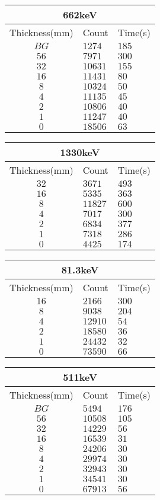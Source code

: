 \documentclass{amsart}
\begin{document}
\begin{tabular}[t]{|c|l|l|}
\hline
\multicolumn{3}{|c|}{662keV}\\
\hline
Thickness(mm) & Count & Time(s)\\
$BG$ & $1274$ & $185$ \\
$56$ & $7971$ & $300$ \\
$32$ & $10631$ & $155$ \\
$16$ & $11431$ & $80$ \\
$8$ & $10324$ & $50$ \\
$4$ & $11135$ & $45$ \\
$2$ & $10806$ & $40$ \\
$1$ & $11247$ & $40$ \\
$0$ & $18506$ & $63$ \\
\hline
\end{tabular}
\qquad
\begin{tabular}[t]{|c|l|l|}
\hline
\multicolumn{3}{|c|}{1330keV}\\
\hline
Thickness(mm) & Count & Time(s)\\
$32$ & $3671$ & $493$ \\
$16$ & $5335$ & $363$ \\
$8$ & $11827$ & $600$ \\
$4$ & $7017$ & $300$ \\
$2$ & $6834$ & $377$ \\
$1$ & $7318$ & $286$ \\
$0$ & $4425$ & $174$ \\
\hline
\end{tabular}

\begin{tabular}[t]{|c|l|l|}
\hline
\multicolumn{3}{|c|}{81.3keV}\\
\hline
Thickness(mm) & Count & Time(s)\\
$16$ & $2166$ & $300$ \\
$8$ & $9038$ & $204$ \\
$4$ & $12910$ & $54$ \\
$2$ & $18580$ & $36$ \\
$1$ & $24432$ & $32$ \\
$0$ & $73590$ & $66$ \\
\hline
\end{tabular}
\qquad
\begin{tabular}[t]{|c|l|l|}
\hline
\multicolumn{3}{|c|}{511keV}\\
\hline
Thickness(mm) & Count & Time(s)\\
$BG$ & $5494$ & $176$ \\
$56$ & $10508$ & $105$ \\
$32$ & $14229$ & $56$ \\
$16$ & $16539$ & $31$ \\
$8$ & $24206$ & $30$ \\
$4$ & $29974$ & $30$ \\
$2$ & $32943$ & $30$ \\
$1$ & $34541$ & $30$ \\
$0$ & $67913$ & $56$ \\
\hline
\end{tabular}
\newline
\end{document}
